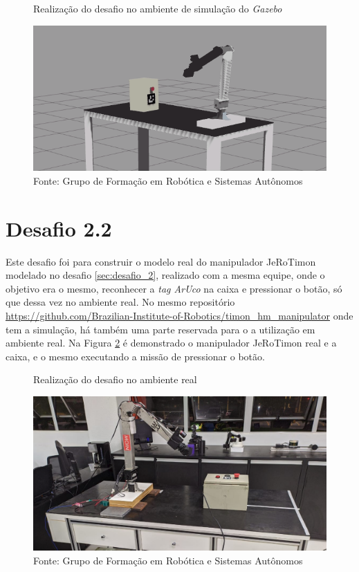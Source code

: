 \begin{figure}[H]
    \caption{Realização do desafio no ambiente de simulação do \textit{Gazebo}}
    \centering
    \includegraphics[width= \textwidth]{Figures/manipulador_simulacao.png}
    \caption*{Fonte: Grupo de Formação em Robótica e Sistemas Autônomos}
    \label{fig:manipulador_simulacao}
\end{figure}



\section{Desafio 2.2 }
\label{sec:desafio_2_2}
Este desafio foi para construir o modelo real do manipulador JeRoTimon modelado no desafio \ref{sec:desafio_2}, realizado com a mesma equipe, onde o objetivo era o mesmo, reconhecer a \textit{tag ArUco} na caixa e pressionar o botão, só que dessa vez no ambiente real. No mesmo repositório \url{https://github.com/Brazilian-Institute-of-Robotics/timon\_hm\_manipulator} onde tem a simulação, há também uma parte reservada para o a utilização em ambiente real. Na Figura \ref{fig:manipulador_real} é demonstrado o manipulador JeRoTimon real e a caixa, e o mesmo executando a missão de pressionar o botão.



\begin{figure}[H]
    \caption{Realização do desafio no ambiente real}
    \centering
    \includegraphics[width= \textwidth]{Figures/manipulador_real.png}
    \caption*{Fonte: Grupo de Formação em Robótica e Sistemas Autônomos}
    \label{fig:manipulador_real}
\end{figure}



